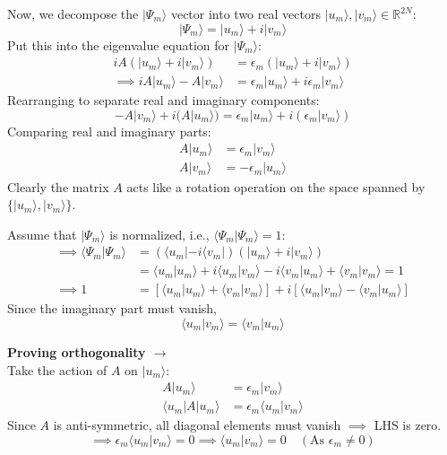 \documentclass[11pt,a4paper]{article}
\begin{document}
Now, we decompose the $|\Psi_m\rangle$ vector into two real vectors $|u_m\rangle, |v_m\rangle \in \mathbb{R}^{2N}$:
\begin{equation*}
|\Psi_m\rangle = |u_m\rangle + i|v_m\rangle
\end{equation*}
Put this into the eigenvalue equation for $|\Psi_m\rangle$:
\begin{align*}
iA(|u_m\rangle + i|v_m\rangle) &= \epsilon_m(|u_m\rangle + i|v_m\rangle) \\
\implies iA|u_m\rangle - A|v_m\rangle &= \epsilon_m|u_m\rangle + i\epsilon_m|v_m\rangle
\end{align*}
Rearranging to separate real and imaginary components:
\begin{equation*}
-A|v_m\rangle + i(A|u_m\rangle) = \epsilon_m|u_m\rangle + i(\epsilon_m|v_m\rangle)
\end{equation*}
Comparing real and imaginary parts:
\begin{align*}
A|u_m\rangle &= \epsilon_m|v_m\rangle \\
A|v_m\rangle &= -\epsilon_m|u_m\rangle
\end{align*}
Clearly the matrix $A$ acts like a rotation operation on the space spanned by $\{|u_m\rangle, |v_m\rangle\}$.

Assume that $|\Psi_m\rangle$ is normalized, i.e., $\langle\Psi_m|\Psi_m\rangle = 1$:
\begin{align*}
\implies \langle\Psi_m|\Psi_m\rangle &= (\langle u_m| - i\langle v_m|)(|u_m\rangle + i|v_m\rangle) \\
&= \langle u_m|u_m\rangle + i\langle u_m|v_m\rangle - i\langle v_m|u_m\rangle + \langle v_m|v_m\rangle = 1 \\
\implies 1 &= [\langle u_m|u_m\rangle + \langle v_m|v_m\rangle] + i[\langle u_m|v_m\rangle - \langle v_m|u_m\rangle]
\end{align*}
Since the imaginary part must vanish,
\begin{equation*}
\langle u_m|v_m\rangle = \langle v_m|u_m\rangle
\end{equation*}

\vspace{0.5cm}
\noindent\textbf{Proving orthogonality $\rightarrow$} \\
Take the action of $A$ on $|u_m\rangle$:
\begin{align*}
A|u_m\rangle &= \epsilon_m|v_m\rangle \\
\langle u_m|A|u_m\rangle &= \epsilon_m\langle u_m|v_m\rangle
\end{align*}
Since $A$ is anti-symmetric, all diagonal elements must vanish $\implies$ LHS is zero.
\begin{equation*}
\implies \epsilon_m\langle u_m|v_m\rangle = 0 \implies \langle u_m|v_m\rangle = 0 \quad (\text{As } \epsilon_m \neq 0)
\end{equation*}
\end{document}
